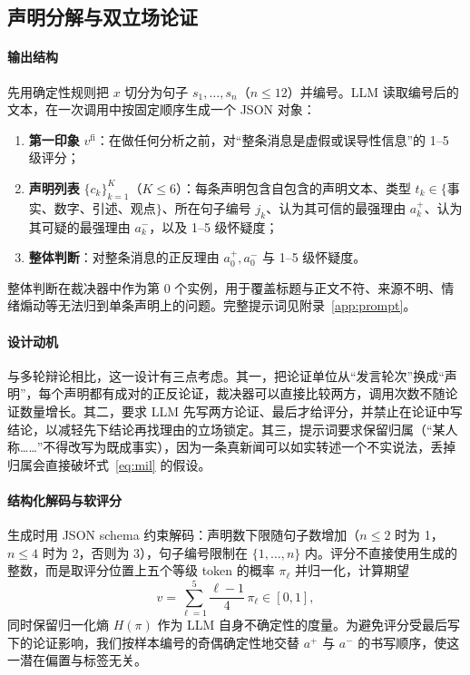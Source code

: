\subsection{声明分解与双立场论证}\label{sec:llm}

\paragraph{输出结构}
先用确定性规则把 $x$ 切分为句子 $s_1,\dots,s_n$（$n\le 12$）并编号。LLM 读取编号后的文本，在一次调用中按固定顺序生成一个 JSON 对象：
\begin{enumerate}
\item \textbf{第一印象} $v^{\mathrm{fi}}$：在做任何分析之前，对“整条消息是虚假或误导性信息”的 1--5 级评分；
\item \textbf{声明列表} $\{c_k\}_{k=1}^{K}$（$K\le 6$）：每条声明包含自包含的声明文本、类型 $t_k\in\{$事实、数字、引述、观点$\}$、所在句子编号 $j_k$、认为其可信的最强理由 $a_k^+$、认为其可疑的最强理由 $a_k^-$，以及 1--5 级怀疑度；
\item \textbf{整体判断}：对整条消息的正反理由 $a_0^+,a_0^-$ 与 1--5 级怀疑度。
\end{enumerate}
整体判断在裁决器中作为第 $0$ 个实例，用于覆盖标题与正文不符、来源不明、情绪煽动等无法归到单条声明上的问题。完整提示词见附录~\ref{app:prompt}。

\paragraph{设计动机}
与多轮辩论\citep{liu2025ted,han2025d2d}相比，这一设计有三点考虑。其一，把论证单位从“发言轮次”换成“声明”，每个声明都有成对的正反论证，裁决器可以直接比较两方，调用次数不随论证数量增长。其二，要求 LLM 先写两方论证、最后才给评分，并禁止在论证中写结论，以减轻先下结论再找理由的立场锁定。其三，提示词要求保留归属（“某人称……”不得改写为既成事实），因为一条真新闻可以如实转述一个不实说法，丢掉归属会直接破坏式~\eqref{eq:mil} 的假设。

\paragraph{结构化解码与软评分}
生成时用 JSON schema 约束解码\citep{kwon2023vllm,dong2024xgrammar}：声明数下限随句子数增加（$n\le2$ 时为 1，$n\le4$ 时为 2，否则为 3），句子编号限制在 $\{1,\dots,n\}$ 内。评分不直接使用生成的整数，而是取评分位置上五个等级 token 的概率 $\pi_\ell$ 并归一化，计算期望
\begin{equation}
v=\sum_{\ell=1}^{5}\frac{\ell-1}{4}\,\pi_\ell\in[0,1],
\end{equation}
同时保留归一化熵 $H(\pi)$ 作为 LLM 自身不确定性的度量。为避免评分受最后写下的论证影响，我们按样本编号的奇偶确定性地交替 $a^+$ 与 $a^-$ 的书写顺序，使这一潜在偏置与标签无关。

